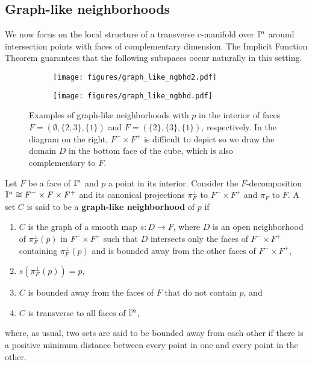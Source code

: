 \subsection{Graph-like neighborhoods}

We now focus on the local structure of a transverse c-manifold over $\mathbb{I}^n$ around intersection points with faces of complementary dimension.
The Implicit Function Theorem guarantees that the following subspaces occur naturally in this setting.

\begin{figure}[!h]
	\centering
	\begin{subfigure}{.32\textwidth}
		\texttt{[image: figures/graph\_like\_ngbhd2.pdf]}
		\hfill
	\end{subfigure}
	\begin{subfigure}{.32\textwidth}
		\hfill
		\texttt{[image: figures/graph\_like\_ngbhd.pdf]}
	\end{subfigure}
	\caption{Examples of graph-like neighborhoods with $p$ in the interior of faces $F=(\emptyset, \{2,3\}, \{1\})$ and $F=(\{2\}, \{3\}, \{1\})$, respectively.
		In the diagram on the right, $F^-\times F^+$ is difficult to depict so we draw the domain $D$ in the bottom face of the cube, which is also complementary to $F$.}
	\label{F: graph like neighborhood}
\end{figure}

\begin{definition}\label{D:graph-like}
	Let $F$ be a face of $\mathbb{I}^n$ and $p$ a point in its interior.
	Consider the $F$-decomposition $\mathbb{I}^n \cong F^- \times F \times F^+$ and its canonical projections $\pi_F^{\perp}$ to $F^- \times F^+$ and $\pi_F$ to $F$.
	A set $C$ is said to be a \textbf{graph-like neighborhood} of $p$ if
	\begin{enumerate}
		\item $C$ is the graph of a smooth map $s: D \to F$, where $D$ is an open neighborhood of $\pi_F^\perp(p)$ in $F^- \times F^+$ such that $D$ intersects only the faces of $F^- \times F^+$ containing $\pi_F^\perp(p)$ and is bounded away from the other faces of $F^- \times F^+$,
		\item $s(\pi_F^\perp(p)) = p$,
		\item $C$ is bounded away from the faces of $F$ that do not contain $p$, and
		\item $C$ is transverse to all faces of $\mathbb{I}^n$,
	\end{enumerate}
	where, as usual, two sets are said to be bounded away from each other if there is a positive minimum distance between every point in one and every point in the other.
\end{definition}

